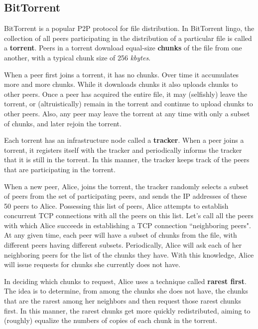 \documentclass[11pt]{article}
\begin{document}
\subsection{BitTorrent}

BitTorrent is a popular P2P protocol for file distribution. In BitTorrent lingo, the collection of all peers participating in the distribution of a particular file is called a \textbf{torrent}. Peers in a torrent download equal-size \textbf{chunks} of the file from one another, with a typical chunk size of 256 \textit{kbytes}. 

When a peer first joins a torrent, it has no chunks. Over time it accumulates more and more chunks. While it downloads chunks it also uploads chunks to other peers. Once a peer has acquired the entire file, it may (selfishly) leave the torrent, or (altruistically) remain in the torrent and continue to upload chunks to other peers. Also, any peer may leave the torrent at any time with only a subset of chunks, and later rejoin the torrent.

 Each torrent has an infrastructure node called a \textbf{tracker}. When a peer joins a torrent, it registers itself with the tracker and periodically informs the tracker that it is still in the torrent. In this manner, the tracker keeps track of the peers that are participating in the torrent.
 
When a new peer, Alice, joins the torrent, the tracker randomly selects a subset of peers from the set of participating peers, and sends the IP addresses of these 50 peers to Alice. Possessing this list of peers, Alice attempts to establish concurrent TCP connections with all the peers on this list. Let’s call all the peers with which Alice succeeds in establishing a TCP connection ``neighboring peers". At any given time, each peer will have a subset of chunks from the file, with different peers having different subsets. Periodically, Alice will ask each of her neighboring peers for the list of the chunks they have. With this knowledge, Alice will issue requests for chunks she currently does not have.

In deciding which chunks to request, Alice uses a technique called \textbf{rarest first}. The idea is to determine, from among the chunks she does not have, the chunks that are the rarest among her neighbors and then request those rarest chunks first. In this manner, the rarest chunks get more quickly redistributed, aiming to (roughly) equalize the numbers of copies of each chunk in the torrent.
\end{document}
